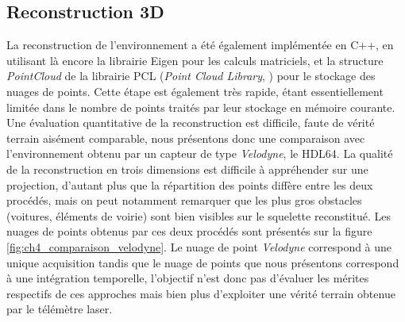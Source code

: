 \subsection{Reconstruction 3D}
La reconstruction de l'environnement a été également implémentée en C++, en utilisant là encore la librairie Eigen pour les calculs matriciels, et la structure \emph{PointCloud} de la librairie PCL (\emph{Point Cloud Library}, \cite{Rusu2011}) pour le stockage des nuages de points. Cette étape est également très rapide, étant essentiellement limitée dans le nombre de points traités par leur stockage en mémoire courante. \\
Une évaluation quantitative de la reconstruction est difficile, faute de vérité terrain aisément comparable, nous présentons donc une comparaison avec l'environnement obtenu par un capteur de type \emph{Velodyne}, le HDL64. La qualité de la reconstruction en trois dimensions est difficile à appréhender sur une projection, d'autant plus que la répartition des points diffère entre les deux procédés, mais on peut notamment remarquer que les plus gros obstacles (voitures, éléments de voirie) sont bien visibles sur le squelette reconstitué. Les nuages de points obtenus par ces deux procédés sont présentés sur la figure \ref{fig:ch4_comparaison_velodyne}. Le nuage de point \emph{Velodyne} correspond à une unique acquisition tandis que le nuage de points que nous présentons correspond à une intégration temporelle, l'objectif n'est donc pas d'évaluer les mérites respectifs de ces approches mais bien plus d'exploiter une vérité terrain obtenue par le télémètre laser.\\

